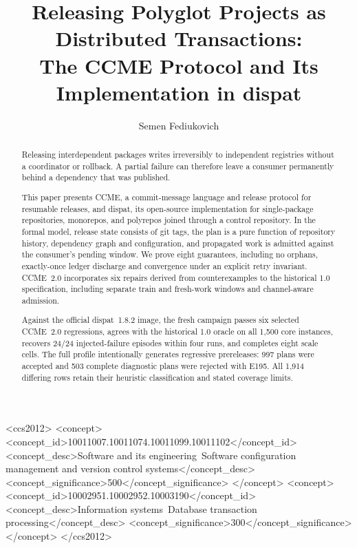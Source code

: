 \documentclass[sigconf,nonacm]{acmart}
\begin{document}
\title{Releasing Polyglot Projects as Distributed Transactions:\\
       The CCME Protocol and Its Implementation in dispat}

\author{Semen Fediukovich}

\renewcommand{\shortauthors}{Semen Fediukovich}

\begin{abstract}
Releasing interdependent packages writes irreversibly to independent
registries without a coordinator or rollback. A partial failure can therefore
leave a consumer permanently behind a dependency that was published.

This paper presents CCME, a commit-message language and release protocol for
resumable releases, and dispat, its open-source implementation for single-package
repositories, monorepos, and polyrepos joined through a control repository.
In the formal model, release state consists of git tags, the
plan is a pure function of repository history, dependency graph and
configuration, and propagated work is admitted against the consumer's pending
window. We prove eight guarantees, including no orphans, exactly-once ledger
discharge and convergence under an explicit retry invariant. CCME~2.0
incorporates six repairs derived from counterexamples to the historical 1.0
specification, including separate train and fresh-work windows and
channel-aware admission.

Against the official dispat~1.8.2 image, the fresh campaign passes six selected
CCME~2.0 regressions, agrees with the historical 1.0 oracle on all 1{,}500 core
instances, recovers 24/24 injected-failure episodes within four runs, and
completes eight scale cells. The full profile intentionally generates
regressive prereleases: 997 plans were accepted and 503 complete diagnostic
plans were rejected with E195. All 1{,}914 differing rows retain their
heuristic classification and stated coverage limits.
\end{abstract}

\begin{CCSXML}
<ccs2012>
<concept>
<concept_id>10011007.10011074.10011099.10011102</concept_id>
<concept_desc>Software and its engineering~Software configuration management and version control systems</concept_desc>
<concept_significance>500</concept_significance>
</concept>
<concept>
<concept_id>10002951.10002952.10003190</concept_id>
<concept_desc>Information systems~Database transaction processing</concept_desc>
<concept_significance>300</concept_significance>
</concept>
</ccs2012>
\end{CCSXML}
\end{document}
